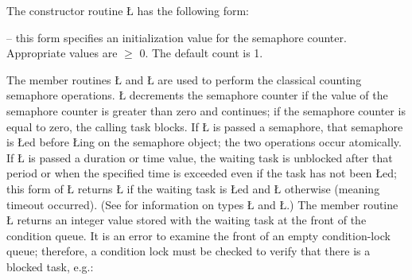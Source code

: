 \documentclass[openright,twoside]{report}
\begin{document}
The constructor routine \LGinlinetrue\LGbegin\lgrinde\L{}\endlgrinde\LGend{} has the following form:
\begin{prefix}
\item[\LGinlinetrue\LGbegin\lgrinde\L{\LB{\V{uSemaphore}(\0\K{int}\0\V{count}\0)}}\endlgrinde\LGend{}]
-- this form specifies an initialization value for the semaphore counter.
Appropriate values are $\geq$ 0.
The default count is 1.
\end{prefix}

The member routines \LGinlinetrue\LGbegin\lgrinde\L{}\endlgrinde\LGend{} and \LGinlinetrue\LGbegin\lgrinde\L{}\endlgrinde\LGend{} are used to perform the classical counting semaphore operations.
\LGinlinetrue\LGbegin\lgrinde\L{}\endlgrinde\LGend{} decrements the semaphore counter if the value of the semaphore counter is greater than zero and continues;
if the semaphore counter is equal to zero, the calling task blocks.
If \LGinlinetrue\LGbegin\lgrinde\L{}\endlgrinde\LGend{} is passed a semaphore, that semaphore is \LGinlinetrue\LGbegin\lgrinde\L{}\endlgrinde\LGend{}ed before \LGinlinetrue\LGbegin\lgrinde\L{}\endlgrinde\LGend{}ing on the semaphore object;
the two operations occur atomically.
If \LGinlinetrue\LGbegin\lgrinde\L{}\endlgrinde\LGend{} is passed a duration or time value, the waiting task is unblocked after that period or when the specified time is exceeded even if the task has not been \LGinlinetrue\LGbegin\lgrinde\L{}\endlgrinde\LGend{}ed;
this form of \LGinlinetrue\LGbegin\lgrinde\L{}\endlgrinde\LGend{} returns \LGinlinetrue\LGbegin\lgrinde\L{}\endlgrinde\LGend{} if the waiting task is \LGinlinetrue\LGbegin\lgrinde\L{}\endlgrinde\LGend{}ed and \LGinlinetrue\LGbegin\lgrinde\L{}\endlgrinde\LGend{} otherwise (meaning timeout occurred).
(See  for information on types \LGinlinetrue\LGbegin\lgrinde\L{}\endlgrinde\LGend{} and \LGinlinetrue\LGbegin\lgrinde\L{}\endlgrinde\LGend{}.)
The member routine \LGinlinetrue\LGbegin\lgrinde\L{}\endlgrinde\LGend{} returns an integer value stored with the waiting task at the front of the condition queue.
It is an error to examine the front of an empty condition-lock queue;
therefore, a condition lock must be checked to verify that there is a blocked task, e.g.:
\end{document}
